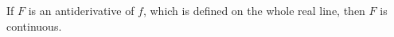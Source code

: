 \documentclass{ximera}
\author{Steven Gubkin}
\begin{document}
\begin{exercise}

If $F$ is an antiderivative of $f$, which is defined on the whole real line, then $F$ is continuous.

	\begin{multipleChoice}	
	\end{multipleChoice}

\end{exercise}
\end{document}
